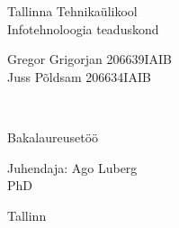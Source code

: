 \begin{titlepage}

\headheight=57pt
\footskip=5pt
\headsep=0pt

\centering
Tallinna Tehnikaülikool\\
Infotehnoloogia teaduskond

\vspace*{4.5 cm}

\begin{center}

Gregor Grigorjan 206639IAIB\\
Juss Põldsam 206634IAIB\\
\vspace*{1.5 cm}

\begin{Large}
\textsc{\textbf{\thesisTitle}}\\
\end{Large}

\vspace*{1.5 cm}
Bakalaureusetöö
\end{center}

\vspace*{0.6 cm}

\begin{flushright}
Juhendaja: Ago Luberg\\PhD\\
\vspace*{0.2 cm}
\end{flushright}
\vfill

Tallinn \the\year{}
\end{titlepage}

